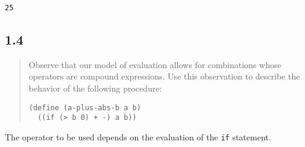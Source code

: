 \documentclass[a4paper, titlepage, twoside]{article}
\begin{document}
\begin{verbatim}
25
\end{verbatim}

\subsection*{1.4}
\label{sec:org8511655}

\begin{quote}
Observe that our model of evaluation allows for combinations whose operators are compound expressions. Use this observation to describe the behavior of the following procedure:

\begin{verbatim}
(define (a-plus-abs-b a b)
  ((if (> b 0) + -) a b))
\end{verbatim}
\end{quote}

The operator to be used depends on the evaluation of the \texttt{if} statement.
\end{document}
